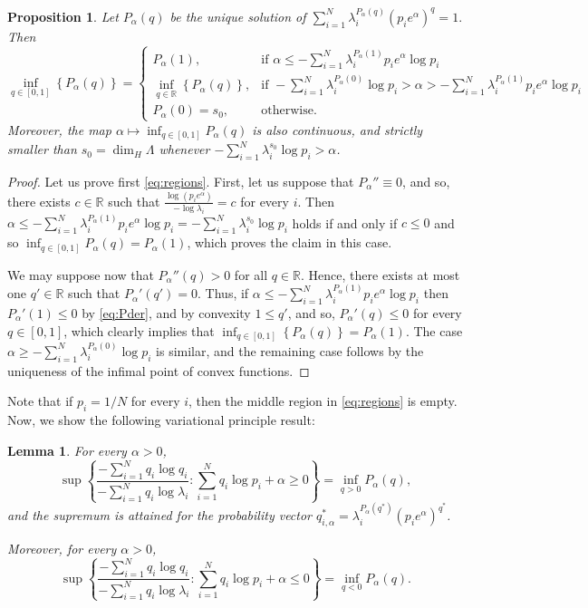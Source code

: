 \documentclass[12pt,]{article}
\newtheorem{proposition}[theorem]{Proposition}
\newtheorem{lemma}[theorem]{Lemma}
\theoremstyle{definition}
\theoremstyle{remark}
\renewcommand{\Bbb}[1]{\mathbb{#1}}
\newcommand{\bbR}{{\Bbb R}}        %
\newcommand{\0}{\mathbf{0}}
\begin{document}
\begin{proposition}\label{thm:legendre}
  Let $P_\alpha(q)$ be the unique solution of $\sum_{i=1}^N \lambda_i^{P_{\alpha}(q)}(p_ie^\alpha)^q=1.$ Then
  \begin{equation}\label{eq:regions}
    \inf_{q\in[0,1]} \left\{P_\alpha(q)\right\}=\begin{cases}
      P_{\alpha}(1), & \mbox{if } \alpha\leq-\sum_{i=1}^N\lambda_i^{P_\alpha(1)}p_ie^\alpha \log p_i \\
      \inf_{q\in\bbR} \left\{P_\alpha(q)\right\}, & \mbox{if } - \sum_{i=1}^N \lambda_i^{P_{\alpha}(0)}\log p_i>\alpha>-\sum_{i=1}^N\lambda_i^{P_{\alpha}(1)}p_ie^\alpha \log p_i \\
      P_{\alpha}(0)=s_0, & \mbox{otherwise}.
    \end{cases}
  \end{equation}
  Moreover, the map $\alpha\mapsto\inf_{q\in[0,1]}P_\alpha(q)$ is also continuous, and strictly smaller than $s_0=\dim_H\Lambda$ whenever $- \sum_{i=1}^N \lambda_i^{s_0}\log p_i>\alpha$.
\end{proposition}

\begin{proof}
  Let us prove first \cref{eq:regions}. First, let us suppose that $P_\alpha''\equiv0$, and so,
  there exists $c\in\bbR$ such that $\frac{\log(p_ie^\alpha)}{-\log\lambda_i}=c$ for every $i$. Then
  $\alpha\leq-\sum_{i=1}^N\lambda_i^{P_\alpha(1)}p_ie^\alpha \log
  p_i=-\sum_{i=1}^N\lambda_i^{s_0}\log p_i$ holds if and only if $c\leq0$ and so
  $\inf_{q\in[0,1]}P_{\alpha}(q)=P_\alpha(1)$, which proves the claim in this case.

  We may suppose now that $P_\alpha''(q)>0$ for all $q\in\bbR$. Hence, there exists at most one
  $q'\in\bbR$ such that $P_{\alpha}'(q')=0$. Thus, if
  $\alpha\leq-\sum_{i=1}^N\lambda_i^{P_\alpha(1)}p_ie^\alpha \log p_i$ then $P_{\alpha}'(1)\leq0$ by
  \cref{eq:Pder}, and by convexity $1\leq q'$, and so, $P_{\alpha}'(q)\leq0$ for every $q\in[0,1]$,
  which clearly implies that $\inf_{q\in[0,1]} \left\{P_\alpha(q)\right\}=P_\alpha(1)$. The case
  $\alpha\geq-\sum_{i=1}^N\lambda_i^{P_\alpha(0)}\log p_i$ is similar, and the remaining case
  follows by the uniqueness of the infimal point of convex functions.
\end{proof}

Note that if $p_i=1/N$ for every $i$, then the middle region in \cref{eq:regions} is empty. Now, we
show the following variational principle result:

\begin{lemma}\label{thm:varprinc}
  For every $\alpha>0$,
  $$
  \sup\left\{\frac{-\sum_{i=1}^Nq_i\log q_i}{-\sum_{i=1}^Nq_i\log\lambda_i} : \sum_{i=1}^Nq_i\log p_i+\alpha\geq0\right\}=\inf_{q>0}P_\alpha(q),
  $$
  and the supremum is attained for the probability vector $q_{i,\alpha}^*=\lambda_i^{P_\alpha(q^*)}(p_ie^{\alpha})^{q^*}$.

  Moreover, for every $\alpha>0$,
  $$
  \sup\left\{\frac{-\sum_{i=1}^Nq_i\log q_i}{-\sum_{i=1}^Nq_i\log\lambda_i} : \sum_{i=1}^Nq_i\log p_i+\alpha\leq0\right\}=\inf_{q<0}P_\alpha(q).
  $$
\end{lemma}
\end{document}
